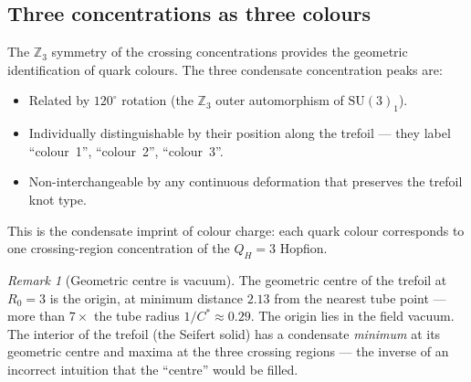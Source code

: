 \documentclass[11pt,a4paper]{article}
\theoremstyle{definition}\newtheorem{definition}[theorem]{Definition}
\theoremstyle{remark}
\newtheorem{remark}[theorem]{Remark}
\newcommand{\SU}{\mathrm{SU}}
\newcommand{\QH}{Q_H}
\begin{document}
\subsection{Three concentrations as three colours}

The $\mathbb{Z}_3$ symmetry of the crossing concentrations provides
the geometric identification of quark colours.
The three condensate concentration peaks are:
\begin{itemize}[noitemsep]
\item Related by $120^\circ$ rotation (the $\mathbb{Z}_3$ outer
  automorphism of $\SU(3)_1$).
\item Individually distinguishable by their position along the
  trefoil --- they label ``colour~1'', ``colour~2'', ``colour~3''.
\item Non-interchangeable by any continuous deformation that
  preserves the trefoil knot type.
\end{itemize}
This is the condensate imprint of colour charge: each quark
colour corresponds to one crossing-region concentration of the
$\QH=3$ Hopfion.

\begin{remark}[Geometric centre is vacuum]
\label{P15:rem:geometric_centre_vacuum}
The geometric centre of the trefoil at $R_0=3$ is the origin,
at minimum distance $2.13$ from the nearest tube point --- more
than $7\times$ the tube radius $1/C^*\approx 0.29$.
The origin lies in the field vacuum.
The interior of the trefoil (the Seifert solid) has a condensate
\emph{minimum} at its geometric centre and maxima at the three
crossing regions --- the inverse of an incorrect intuition that
the ``centre'' would be filled.
\end{remark}
\end{document}
